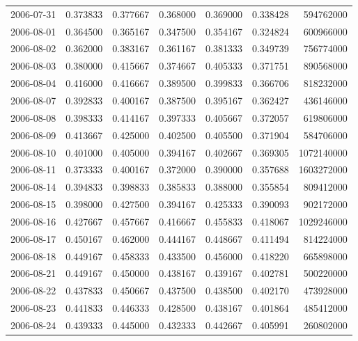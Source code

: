 \begin{tabular}{lrrrrrr}
2006-07-31 &    0.373833 &    0.377667 &    0.368000 &    0.369000 &    0.338428 &   594762000 \\
2006-08-01 &    0.364500 &    0.365167 &    0.347500 &    0.354167 &    0.324824 &   600966000 \\
2006-08-02 &    0.362000 &    0.383167 &    0.361167 &    0.381333 &    0.349739 &   756774000 \\
2006-08-03 &    0.380000 &    0.415667 &    0.374667 &    0.405333 &    0.371751 &   890568000 \\
2006-08-04 &    0.416000 &    0.416667 &    0.389500 &    0.399833 &    0.366706 &   818232000 \\
2006-08-07 &    0.392833 &    0.400167 &    0.387500 &    0.395167 &    0.362427 &   436146000 \\
2006-08-08 &    0.398333 &    0.414167 &    0.397333 &    0.405667 &    0.372057 &   619806000 \\
2006-08-09 &    0.413667 &    0.425000 &    0.402500 &    0.405500 &    0.371904 &   584706000 \\
2006-08-10 &    0.401000 &    0.405000 &    0.394167 &    0.402667 &    0.369305 &  1072140000 \\
2006-08-11 &    0.373333 &    0.400167 &    0.372000 &    0.390000 &    0.357688 &  1603272000 \\
2006-08-14 &    0.394833 &    0.398833 &    0.385833 &    0.388000 &    0.355854 &   809412000 \\
2006-08-15 &    0.398000 &    0.427500 &    0.394167 &    0.425333 &    0.390093 &   902172000 \\
2006-08-16 &    0.427667 &    0.457667 &    0.416667 &    0.455833 &    0.418067 &  1029246000 \\
2006-08-17 &    0.450167 &    0.462000 &    0.444167 &    0.448667 &    0.411494 &   814224000 \\
2006-08-18 &    0.449167 &    0.458333 &    0.433500 &    0.456000 &    0.418220 &   665898000 \\
2006-08-21 &    0.449167 &    0.450000 &    0.438167 &    0.439167 &    0.402781 &   500220000 \\
2006-08-22 &    0.437833 &    0.450667 &    0.437500 &    0.438500 &    0.402170 &   473928000 \\
2006-08-23 &    0.441833 &    0.446333 &    0.428500 &    0.438167 &    0.401864 &   485412000 \\
2006-08-24 &    0.439333 &    0.445000 &    0.432333 &    0.442667 &    0.405991 &   260802000 \\

\end{tabular}
